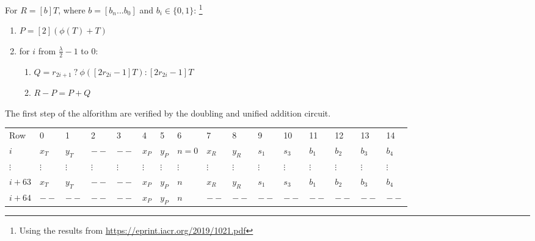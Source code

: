 For $R  = [b]T$, where $b = [b_n ... b_0]$ and $b_i \in \{0, 1\}$:
 \footnote{Using the results from \url{https://eprint.iacr.org/2019/1021.pdf}}
\begin{enumerate}
    \item $P = [2](\phi(T) + T)$
    \item for $i$ from $\frac{\lambda}{2} - 1$ to $0$:
    \begin{enumerate}
        \item $Q = r_{2i + 1} \: ? \: \phi([2r_{2i} - 1]T) : [2r_{2i} - 1]T$
        \item $R - P = P + Q$
    \end{enumerate}
\end{enumerate}
The first step of the alforithm are verified by the doubling and unified addition circuit. 

\begin{center}
    \begin{table}[H]
        \begin{tabular}{llllllllllllllll}
            Row    & 0        & 1        & 2        & 3        & 4        & 5        & 6        & 7        & 8        & 9        & 10       & 11       & 12       & 13       & 14       \\
            $i$   & $x_T$    & $y_T$    & $--$    & $--$    & $x_P$    & $y_P$    & $n = 0$      & $x_R$    & $y_R$    & $s_1$    & $s_3$    & $b_1$    & $b_2$ & $b_3$ & $b_4$ \\
            $\vdots$ & $\vdots$ & $\vdots$ & $\vdots$ & $\vdots$ & $\vdots$ & $\vdots$ & $\vdots$ & $\vdots$ & $\vdots$ & $\vdots$ & $\vdots$ & $\vdots$ & $\vdots$ & $\vdots$ & $\vdots$ \\
            $i + 63$ &  $x_T$    & $y_T$    & $--$    & $--$    & $x_P$    & $y_P$    & $n$      & $x_R$    & $y_R$    & $s_1$    & $s_3$    & $b_1$    & $b_2$ & $b_3$ & $b_4$ \\
            $i + 64$ &  $--$    & $--$    & $--$    & $--$    & $x_P$    & $y_P$    & $n$      & $--$    & $--$    & $--$    & $--$    & $--$    & $--$ & $--$ & $--$ \\
        \end{tabular}
    \end{table}
\end{center}

